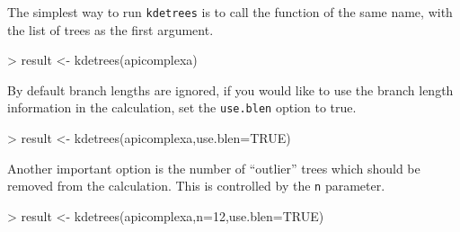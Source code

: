 \documentclass{article}
\begin{document}
The simplest way to run {\tt kdetrees} is to call the function of the
same name, with the list of trees as the first argument.
\begin{Schunk}
\begin{Sinput}
> result <- kdetrees(apicomplexa)
\end{Sinput}
\end{Schunk}
By default branch lengths are ignored, if you would like to use the
branch length information in the calculation, set the {\tt use.blen}
option to true.
\begin{Schunk}
\begin{Sinput}
> result <- kdetrees(apicomplexa,use.blen=TRUE)
\end{Sinput}
\end{Schunk}
Another important option is the number of ``outlier'' trees which should be
removed from the calculation. This is controlled by the {\tt n} parameter.
\begin{Schunk}
\begin{Sinput}
> result <- kdetrees(apicomplexa,n=12,use.blen=TRUE)
\end{Sinput}
\end{Schunk}
\end{document}
